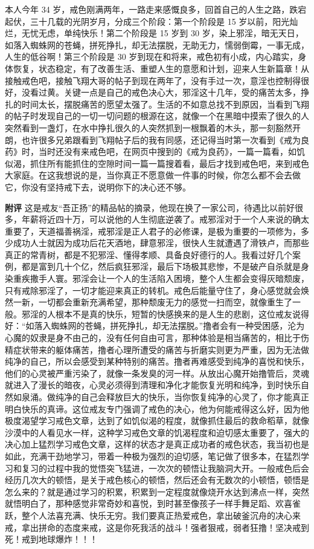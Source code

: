 \begin{case}
    本人今年 34 岁，戒色刚满两年，一路走来感慨良多，回首自己的人生之路，跌宕起伏，三十几载的光阴岁月，分成三个阶段：第一个阶段是 15 岁以前，阳光灿烂，无忧无虑，单纯快乐！第二个阶段是 15 岁到 30 岁，染上邪淫，暗无天日，如落入蜘蛛网的苍蝇，拼死挣扎，却无法摆脱，无助无力，懦弱倒霉，一事无成，人生的低谷啊！第三个阶段是 30 岁到现在和将来，戒色初有小成，内心踏实，身体恢复，状态稳定，有了改善生活、重塑人生的意愿和计划，迎来人生新篇章！从接触戒色吧，接触飞翔大哥的帖子到现在两年了，没有手过一次，意淫也控制得很好，没看过黄。关键一点是自己的戒色决心大，邪淫这十几年，受的痛苦太多，挣扎的时间太长，摆脱痛苦的愿望太强了。生活的不如意总找不到原因，当看到飞翔的帖子时发现自己的一切一切问题的根源在这，就像一个在黑暗中摸索了很久的人突然看到一盏灯，在水中挣扎很久的人突然抓到一根飘着的木头，那一刻豁然开朗，也许很多兄弟跟看到飞翔帖子后的我有同感，还记得当时第一次看到《戒为良药》时，当时还没有来戒色吧，在网页中搜到的《戒为良药》，一篇一篇看，如饥似渴，抓住所有能抓住的空隙时间一篇一篇搜着看，最后才找到戒色吧，来到戒色大家庭。在这我想说的是，当你真正不愿意做一件事的时候，你怎么都不会去做它，你没有坚持戒下去，说明你下的决心还不够。

    \textbf{附评} 这是戒友“吾正扬”的精品帖的摘录，他现在换了一家公司，待遇比以前好很多，年薪将近四十万，可以说他的人生彻底逆袭了。戒邪淫对于一个人来说的确太重要了，天道福善祸淫，戒邪淫是正人君子的必修课，是极为重要的一项修为，多少成功人士就因为成功后花天酒地，肆意邪淫，很快人生就遭遇了滑铁卢，而那些真正的常青树，都是不犯邪淫、懂得孝顺、具备良好德行的人。我看过好几个案例，都是富到几十个亿，然后疯狂邪淫，最后下场极其悲惨，不是破产自杀就是身染重疾撒手人寰。邪淫会让一个人的生活陷入困境，整个人生都会变得灰暗颓废，只有戒除邪淫了，一切才能迎来真正的转机。戒色后能量守住了，身心感觉就会焕然一新，一切都会重新充满希望，那种颓废无力的感觉一扫而空，就像重生了一般。邪淫的人根本不是真的快乐，短暂的快感换来的是人生的悲剧，这位戒友说得好：“如落入蜘蛛网的苍蝇，拼死挣扎，却无法摆脱。”撸者会有一种受困感，沦为心魔的奴隶是身不由己的，没有任何自由可言，那种体验是相当痛苦的，相比于伤精症状带来的躯体痛苦，撸者心理所遭受的痛苦与折磨实则更为严重，因为无法做纯净的自己，所以会感受到某种特别的痛苦。撸者再难感受到纯净的喜悦和快乐，他们的心灵被严重污染了，就像一条发臭的河一样。从放出心魔开始撸管后，灵魂就进入了漫长的暗夜，心灵必须得到清理和净化才能恢复光明和纯净，到时快乐自然如泉涌。做纯净的自己会释放巨大的快乐，当你恢复纯净的心灵了，你才能真正明白快乐的真谛。这位戒友专门强调了戒色的决心，他为何能戒得这么好，因为他极度渴望学习戒色文章，达到了如饥似渴的程度，就像抓住最后的救命稻草，就像沙漠中的人看见水一样，这种学习戒色文章的饥渴程度和迫切感太重要了，强大的决心加上猛烈学习戒色文章，这样的状态才是真正成功者的戒色状态，我当初也是如此，充满干劲地学习，带着一种极为强烈的迫切感，笔记做了很多本，在猛烈学习和复习的过程中我的觉悟突飞猛进，一次次的顿悟让我脑洞大开。一般戒色后会经历几次大的顿悟，是关于戒色核心的顿悟，然后还会有无数次的小顿悟，顿悟是怎么来的？就是通过学习的积累，积累到一定程度就像烧开水达到沸点一样，突然就悟明白了，那种感觉非常奇妙和喜悦，到时甚至像孩子一样手舞足蹈、欢喜雀跃，整个人法喜充满、快乐无穷。我们要真正热爱戒色，拿出破釜沉舟的决心来戒，拿出拼命的态度来戒，这是你死我活的战斗！强者狠戒，弱者狂撸！坚决戒到死！戒到地球爆炸！！！
\end{case}


